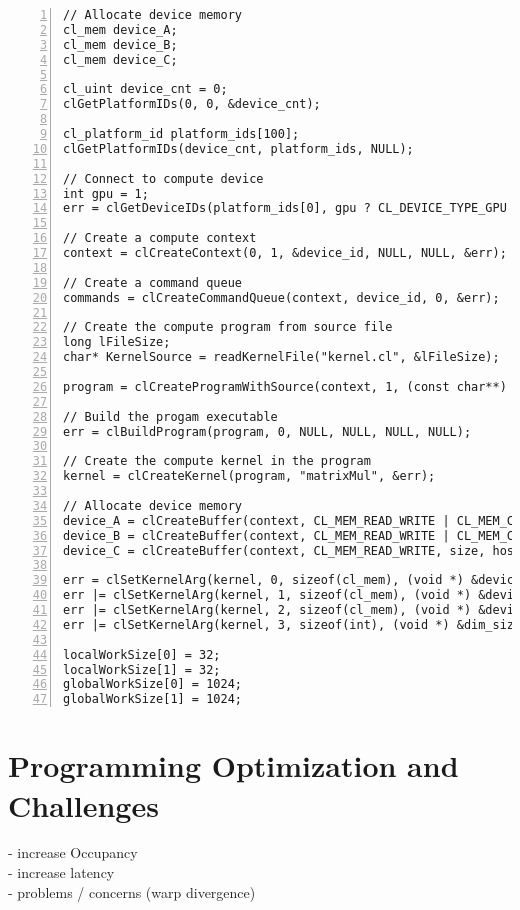 \documentclass[a4paper,12pt]{llncs}
\numberwithin{equation}{section}
\begin{document}
  
\begin{lstlisting}[style=cpp,caption={Kernel Function of Matrix Multiplication},label={lst:OpenCL},numbers=left]
// Allocate device memory
cl_mem device_A;
cl_mem device_B;
cl_mem device_C;

cl_uint device_cnt = 0;
clGetPlatformIDs(0, 0, &device_cnt);

cl_platform_id platform_ids[100];
clGetPlatformIDs(device_cnt, platform_ids, NULL);

// Connect to compute device
int gpu = 1;
err = clGetDeviceIDs(platform_ids[0], gpu ? CL_DEVICE_TYPE_GPU : CL_DEVICE_TYPE_CPU, 1, &device_id, NULL);

// Create a compute context
context = clCreateContext(0, 1, &device_id, NULL, NULL, &err);

// Create a command queue
commands = clCreateCommandQueue(context, device_id, 0, &err);

// Create the compute program from source file
long lFileSize;
char* KernelSource = readKernelFile("kernel.cl", &lFileSize);

program = clCreateProgramWithSource(context, 1, (const char**) &KernelSource, NULL, &err);

// Build the progam executable
err = clBuildProgram(program, 0, NULL, NULL, NULL, NULL);

// Create the compute kernel in the program
kernel = clCreateKernel(program, "matrixMul", &err);

// Allocate device memory
device_A = clCreateBuffer(context, CL_MEM_READ_WRITE | CL_MEM_COPY_HOST_PTR, size, host_A, &err);
device_B = clCreateBuffer(context, CL_MEM_READ_WRITE | CL_MEM_COPY_HOST_PTR, size, host_B, &err);
device_C = clCreateBuffer(context, CL_MEM_READ_WRITE, size, host_C, &err);

err = clSetKernelArg(kernel, 0, sizeof(cl_mem), (void *) &device_A);
err |= clSetKernelArg(kernel, 1, sizeof(cl_mem), (void *) &device_B);
err |= clSetKernelArg(kernel, 2, sizeof(cl_mem), (void *) &device_C);
err |= clSetKernelArg(kernel, 3, sizeof(int), (void *) &dim_size);

localWorkSize[0] = 32;
localWorkSize[1] = 32;
globalWorkSize[0] = 1024;
globalWorkSize[1] = 1024;

\end{lstlisting}

\section{Programming Optimization and Challenges}
  - increase Occupancy\\
  - increase latency\\
  - problems / concerns (warp divergence)\\
\end{document}

